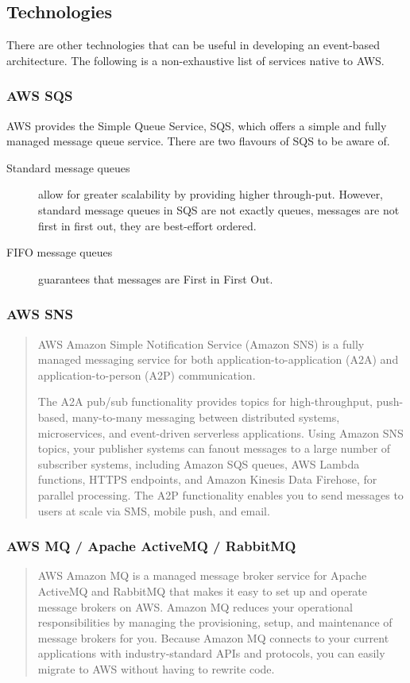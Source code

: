 \documentclass{csse4400}
\begin{document}
\subsection{Technologies}

There are other technologies that can be useful in developing an event-based architecture.
The following is a non-exhaustive list of services native to AWS.

\subsubsection{AWS SQS}

AWS provides the Simple Queue Service, SQS,
which offers a simple and fully managed message queue service.
There are two flavours of SQS to be aware of.
\begin{description}
    \item[Standard message queues] allow for greater scalability by providing higher through-put.
However, standard message queues in SQS are not exactly queues,
messages are not first in first out,
they are best-effort ordered.
    \item[FIFO message queues] guarantees that messages are First in First Out.
\end{description}

\subsubsection{AWS SNS}
\begin{quote}{AWS}
Amazon Simple Notification Service (Amazon SNS) is a fully managed messaging service for both application-to-application (A2A) and application-to-person (A2P) communication.

The A2A pub/sub functionality provides topics for high-throughput,
push-based, many-to-many messaging between distributed systems,
microservices, and event-driven serverless applications.
Using Amazon SNS topics,
your publisher systems can fanout messages to a large number of subscriber systems,
including Amazon SQS queues, AWS Lambda functions,
HTTPS endpoints, and Amazon Kinesis Data Firehose,
for parallel processing.
The A2P functionality enables you to send messages to users at scale via SMS, mobile push, and email.
\end{quote}

\subsubsection{AWS MQ / Apache ActiveMQ / RabbitMQ}
\begin{quote}{AWS}
Amazon MQ is a managed message broker service for Apache ActiveMQ and RabbitMQ that makes it easy to set up and operate message brokers on AWS.
Amazon MQ reduces your operational responsibilities by managing the provisioning, setup, and maintenance of message brokers for you.
Because Amazon MQ connects to your current applications with industry-standard APIs and protocols,
you can easily migrate to AWS without having to rewrite code.
\end{quote}
\end{document}
